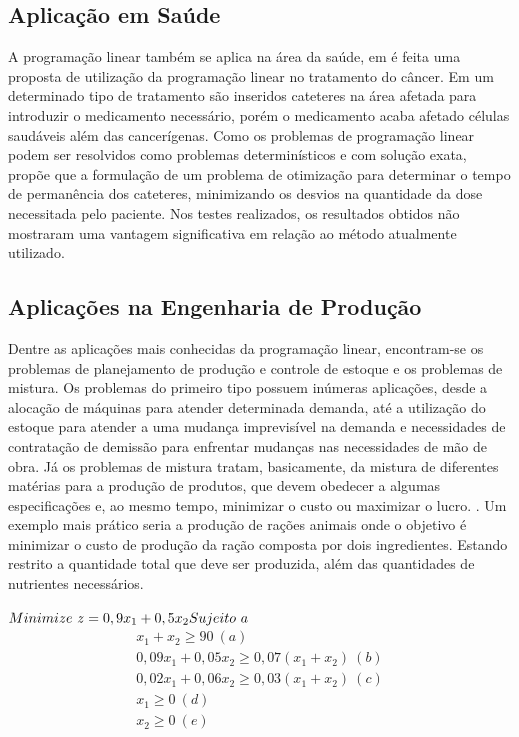 \subsection{Aplicação em Saúde}
A programação linear também se aplica na área da saúde, em  é feita uma proposta de utilização da programação linear no tratamento do câncer. 
Em um determinado tipo de tratamento são inseridos cateteres na área afetada para introduzir o medicamento necessário, porém o medicamento acaba afetado células saudáveis além das cancerígenas. Como os problemas de programação linear podem ser resolvidos como problemas determinísticos e com solução exata,  propõe que a formulação de um problema de otimização para determinar o tempo de permanência dos cateteres, minimizando os desvios na quantidade da dose necessitada pelo paciente. Nos testes realizados, os resultados obtidos não mostraram uma vantagem significativa em relação ao método atualmente utilizado.

\subsection{Aplicações na Engenharia de Produção}
Dentre as aplicações mais conhecidas da programação linear, encontram-se os problemas de planejamento de produção e controle de estoque e os problemas de mistura. Os problemas do primeiro tipo possuem inúmeras aplicações, desde a alocação de máquinas para atender determinada demanda, até a utilização do estoque para atender a uma mudança imprevisível na demanda e necessidades de contratação de demissão para enfrentar mudanças nas necessidades de mão de obra. Já os problemas de mistura tratam, basicamente, da mistura de diferentes matérias para a produção de produtos, que devem obedecer a algumas especificações e, ao mesmo tempo, minimizar o custo ou maximizar o lucro.  \cite{Taha}.
Um exemplo mais prático seria a produção de rações animais onde o objetivo é minimizar o custo de produção da ração composta por dois ingredientes. Estando restrito a quantidade total que deve ser produzida, além das quantidades de nutrientes necessários.

 $\\Minimize\ z=0,9x_{1}+0,5x_{2}\\
Sujeito\ a\\$
\begin{eqnarray*}
        x_{1}+x_{2}\geq 90 \ (a)\\
        0,09x_{1}+0,05x_{2}\geq 0,07(x_{1}+x_{2}) \ (b)\\
        0,02x_{1}+0,06x_{2}\geq 0,03(x_{1}+x_{2}) \ (c)\\
         x_{1}\geq 0 \ (d)\\
	 x_{2}\geq 0 \ (e)
\end{eqnarray*}


